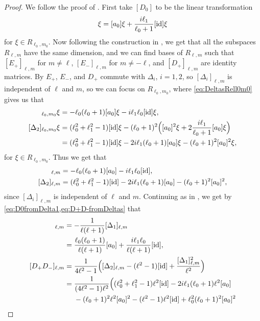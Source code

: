 \begin{proof}
  We follow the proof of . First take $[D_0]$ to be the linear transformation
  \begin{align*}
    [D_0]\xi = [a_0]\xi + \dfrac{i\ell_1}{\ell_0+1}[\id]\xi
  \end{align*}
  for $\xi\in R_{\ell_0,m_0}$. Now following the construction in , we get that all the subspaces $R_{\ell,m}$ have the same dimension, and we can find bases of $R_{\ell,m}$ such that $[E_+]_{\ell,m}$ for $m\neq\ell$, $[E_-]_{\ell,m}$ for $m\neq -\ell$, and $[D_+]_{\ell,m}$ are identity matrices. By  $E_+$, $E_-$, and $D_+$ commute with $\Delta_i$, $i=1,2$, so $[\Delta_i]_{\ell,m}$ is independent of $\ell$ and $m$, so we can focus on $R_{\ell_0,m_0}$, where \cref{eq:DeltasRell0m0} gives us that
  \begin{align*}
    [\Delta_1]_{\ell_0,m_0} \xi &= -\ell_0(\ell_0+1)[a_0]\xi - i\ell_1\ell_0[\id]\xi, \\
    [\Delta_2]_{\ell_0,m_0} \xi &= (\ell_0^2+\ell_1^2-1)[\id]\xi - (\ell_0+1)^2\Bigl( [a_0]^2\xi + 2\dfrac{i\ell_1}{\ell_0+1}[a_0]\xi \Bigr) \\
    &= (\ell_0^2+\ell_1^2-1)[\id]\xi - 2i\ell_1(\ell_0+1)[a_0]\xi - (\ell_0+1)^2[a_0]^2\xi,
  \end{align*}
  for $\xi \in R_{\ell_0,m_0}$. Thus we get that
  \begin{align*}
    [\Delta_1]_{\ell,m} &= -\ell_0(\ell_0+1)[a_0] - i\ell_1\ell_0[\id], \\
    [\Delta_2]_{\ell,m} &= (\ell_0^2+\ell_1^2-1)[\id] - 2i\ell_1(\ell_0+1)[a_0] - (\ell_0+1)^2[a_0]^2,
  \end{align*}
  since $[\Delta_i]_{\ell,m}$ is independent of $\ell$ and $m$. Continuing as in , we get by \cref{eq:D0fromDelta1,eq:D+D-fromDeltas} that
  \begin{align*}
    [D_0]_{\ell,m} &= - \dfrac{1}{\ell(\ell+1)}[\Delta_1]_{\ell,m} \\
                &= \dfrac{\ell_0(\ell_0+1)}{\ell(\ell+1)}[a_0] + \dfrac{i\ell_1\ell_0}{\ell(\ell+1)}[\id], \\
    [D_+D_-]_{\ell,m} &= \dfrac{1}{4\ell^2-1}\Bigl( [\Delta_2]_{\ell,m} - (\ell^2-1)[\id] + \dfrac{[\Delta_1]_{\ell,m}^2}{\ell^2} \Bigr) \\
                &= \dfrac{1}{(4\ell^2-1)\ell^2} \Bigl( (\ell_0^2+\ell_1^2-1)\ell^2[\id] - 2i\ell_1(\ell_0+1)\ell^2[a_0] \\*
                &\phantom{{}={}}{} - (\ell_0+1)^2\ell^2[a_0]^2 - (\ell^2-1)\ell^2[\id] + \ell_0^2(\ell_0+1)^2[a_0]^2  \\*

\end{align*}
\end{proof}
